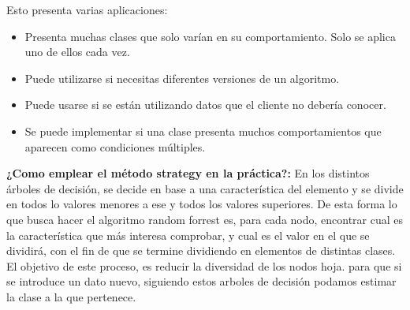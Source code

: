 \documentclass[11pt]{article}
\theoremstyle{plain}
\begin{document}
            Esto presenta varias aplicaciones:
            \begin{itemize}
                \item Presenta muchas clases que solo varían en su comportamiento. Solo se aplica uno de ellos cada vez.
                \item Puede utilizarse si necesitas diferentes versiones de un algoritmo.
                \item Puede usarse si se están utilizando datos que el cliente no debería conocer.
                \item Se puede implementar si una clase presenta muchos comportamientos que aparecen como condiciones múltiples.
            \end{itemize}
            \textbf{¿Como emplear el método strategy en la práctica?:} En los distintos árboles de decisión, se decide en base a una característica del elemento y se divide en todos lo valores menores a ese y todos los valores superiores. De esta forma lo que busca hacer el algoritmo random forrest es, para cada nodo, encontrar cual es la característica que más interesa comprobar, y cual es el valor en el que se dividirá, con el fin de que se termine dividiendo en elementos de distintas clases. El objetivo de este proceso, es reducir la diversidad de los nodos hoja. para que si se introduce un dato nuevo, siguiendo estos arboles de decisión podamos estimar la clase a la que pertenece.

\end{document}

